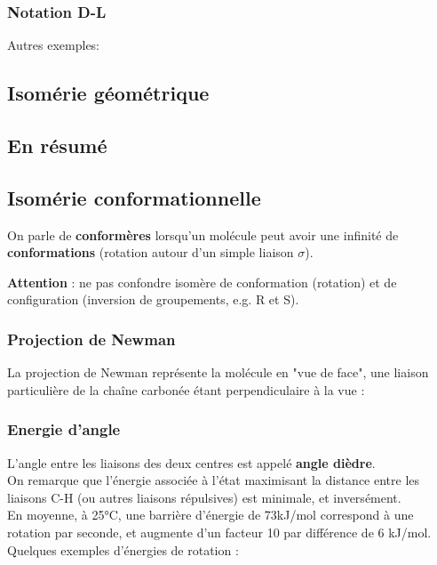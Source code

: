\documentclass{article}
\newcommand{\insertslide}[2]{
\begin{center}
    \fbox{\texttt{[image: \#1]}}
\end{center}
}
\begin{document}
        \subsubsection{Notation D-L}
            \insertslide{Slides/CM2.pdf}{43}
            Autres exemples:
            \insertslide{Slides/CM2.pdf}{44}
            \insertslide{Slides/CM2.pdf}{45}

    \subsection{Isomérie géométrique}
        \insertslide{Slides/CM2.pdf}{46}
        \insertslide{Slides/CM2.pdf}{47}
        \insertslide{Slides/CM2.pdf}{48}
    
    \subsection{En résumé}
        \insertslide{Slides/CM2.pdf}{50}
        \insertslide{Slides/CM2.pdf}{51}
\pagebreak
    \subsection{Isomérie conformationnelle}
        On parle de \textbf{conformères} lorsqu'un molécule peut avoir une infinité de \textbf{conformations} (rotation autour d'un simple liaison $\sigma$).
        \insertslide{Slides/CM2}{54}
        \textbf{Attention} : ne pas confondre isomère de conformation (rotation) et de configuration (inversion de groupements, e.g. R et S).
        \subsubsection{Projection de Newman}
            La projection de Newman représente la molécule en "vue de face", une liaison particulière de la chaîne carbonée étant perpendiculaire à la vue :
            \insertslide{Slides/CM2}{56}
\pagebreak
        \subsubsection{Energie d'angle}
            L'angle entre les liaisons des deux centres est appelé \textbf{angle dièdre}.\\
            On remarque que l'énergie associée à l'état maximisant la distance entre les liaisons C-H (ou autres liaisons répulsives) est minimale, et inversément.\\
            En moyenne, à 25°C, une barrière d'énergie de 73kJ/mol correspond à une rotation par seconde, et augmente d'un facteur 10 par différence de 6 kJ/mol.\\
            Quelques exemples d'énergies de rotation :
            \insertslide{Slides/CM2}{60}
\end{document}
